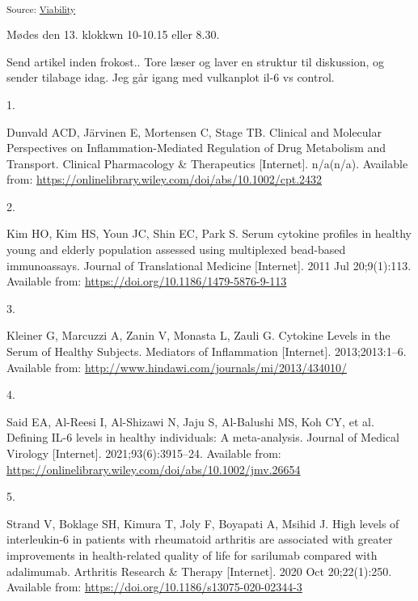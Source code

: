 \documentclass[
  letterpaper,
  DIV=11,
  numbers=noendperiod,
  oneside]{scrartcl}
\newlength{\cslhangindent}
\newlength{\csllabelwidth}
\newenvironment{CSLReferences}[2] %
 {\begin{list}{}{%
  \setlength{\itemindent}{0pt}
  \setlength{\leftmargin}{0pt}
  \setlength{\parsep}{0pt}
  \ifodd #1
   \setlength{\leftmargin}{\cslhangindent}
   \setlength{\itemindent}{-1\cslhangindent}
  \fi
  \setlength{\itemsep}{#2\baselineskip}}}
 {\end{list}}
\newcommand{\CSLLeftMargin}[1]{\parbox[t]{\csllabelwidth}{\strut#1\strut}}
\newcommand{\CSLRightInline}[1]{\parbox[t]{\linewidth - \csllabelwidth}{\strut#1\strut}}
\begin{document}
\textsubscript{Source:
\href{https://andreasludvig.github.io/manuscript/notebooks/viability/Viability-preview.html\#cell-fig-donor-viabilities}{Viability}}

Mødes den 13. klokkwn 10-10.15 eller 8.30.

Send artikel inden frokost.. Tore læser og laver en struktur til
diskussion, og sender tilabage idag. Jeg går igang med vulkanplot il-6
vs control.

\label{refs}
\begin{CSLReferences}{0}{1}
\CSLLeftMargin{1. }%
\CSLRightInline{Dunvald ACD, Järvinen E, Mortensen C, Stage TB. Clinical
and Molecular Perspectives on Inflammation-Mediated Regulation of Drug
Metabolism and Transport. Clinical Pharmacology \& Therapeutics
{[}Internet{]}. n/a(n/a). Available from:
\url{https://onlinelibrary.wiley.com/doi/abs/10.1002/cpt.2432}}

\CSLLeftMargin{2. }%
\CSLRightInline{Kim HO, Kim HS, Youn JC, Shin EC, Park S. Serum cytokine
profiles in healthy young and elderly population assessed using
multiplexed bead-based immunoassays. Journal of Translational Medicine
{[}Internet{]}. 2011 Jul 20;9(1):113. Available from:
\url{https://doi.org/10.1186/1479-5876-9-113}}

\CSLLeftMargin{3. }%
\CSLRightInline{Kleiner G, Marcuzzi A, Zanin V, Monasta L, Zauli G.
Cytokine Levels in the Serum of Healthy Subjects. Mediators of
Inflammation {[}Internet{]}. 2013;2013:1--6. Available from:
\url{http://www.hindawi.com/journals/mi/2013/434010/}}

\CSLLeftMargin{4. }%
\CSLRightInline{Said EA, Al-Reesi I, Al-Shizawi N, Jaju S, Al-Balushi
MS, Koh CY, et al. Defining IL-6 levels in healthy individuals: A
meta-analysis. Journal of Medical Virology {[}Internet{]}.
2021;93(6):3915--24. Available from:
\url{https://onlinelibrary.wiley.com/doi/abs/10.1002/jmv.26654}}

\CSLLeftMargin{5. }%
\CSLRightInline{Strand V, Boklage SH, Kimura T, Joly F, Boyapati A,
Msihid J. High levels of interleukin-6 in patients with rheumatoid
arthritis are associated with greater improvements in health-related
quality of life for sarilumab compared with adalimumab. Arthritis
Research \& Therapy {[}Internet{]}. 2020 Oct 20;22(1):250. Available
from: \url{https://doi.org/10.1186/s13075-020-02344-3}}


\end{CSLReferences}
\end{document}
